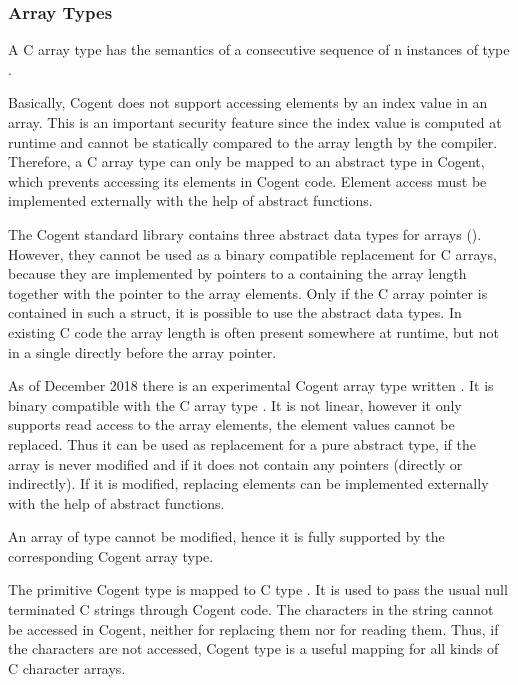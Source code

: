 \subsubsection{Array Types}

A C array type  has the semantics of a consecutive sequence of n instances of type . 

Basically, Cogent does not support accessing elements by an index value in an array. 
This is an important security feature since the index value is computed at runtime and cannot be statically 
compared to the array length by the compiler. Therefore, a C array type can only be mapped to an abstract type 
in Cogent, which prevents accessing its elements in Cogent code. Element access must be implemented externally 
with the help of abstract functions.

The Cogent standard library contains three abstract data types for arrays (). 
However, they cannot be used as a binary compatible replacement for C arrays, because they are implemented by 
pointers to a  containing the array length together with the pointer to the array elements. 
Only if the C array pointer is contained in such a struct, it is possible to use the abstract data types. 
In existing C code the array length is often present somewhere at runtime, but not in a single 
directly before the array pointer.

As of December 2018 there is an experimental Cogent array type written . It is binary compatible 
with the C array type . It is not linear, however it only supports read access to the array elements, 
the element values cannot be replaced. Thus it can be used as replacement for a pure abstract type, if the array 
is never modified and if it does not contain any pointers (directly or indirectly). If it is modified, replacing
elements can be implemented externally with the help of abstract functions.

An array of type  cannot be modified, hence it is fully supported by the corresponding 
Cogent array type.

The primitive Cogent type  is mapped to C type . It is used to pass the usual 
null terminated C strings through Cogent code. The characters in the string cannot be accessed in Cogent, 
neither for replacing them nor for reading them. Thus, if the characters are not accessed, Cogent type
 is a useful mapping for all kinds of C character arrays.

